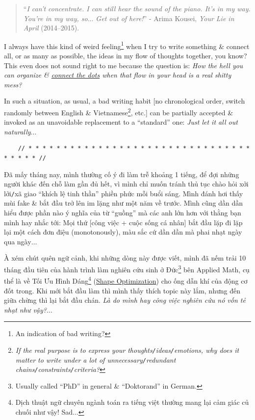 \documentclass[12pt]{article}
\begin{document}
\begin{quotation}
	``{\it I can't concentrate. I can still hear the sound of the piano. It's in my way. You're in my way, so$\ldots$ Get out of here!}'' - Arima Kousei, {\it Your Lie in April} (2014--2015).
\end{quotation}

I always have this kind of weird feeling\footnote{An indication of bad writing?} when I try to write something \& connect all, or as many as possible, the ideas in my flow of thoughts together, you know? This even does not sound right to me because the question is: {\it How the hell you can organize \& \href{https://en.wikipedia.org/wiki/Connect_the_dots}{connect the dots} when that flow in your head is a real shitty mess?}

In such a situation, as usual, a bad writing habit [no chronological order, switch randomly between English \& Vietnamese\footnote{{\it If the real purpose is to express your thoughts{\tt/}ideas{\tt/}emotions, why does it matter to write under a lot of unnecessary{\tt/}redundant chains{\tt/}constraints{\tt/}criteria?}}, etc.] can be partially accepted \& invoked as an unavoidable replacement to a ``standard'' one: {\it Just let it all out naturally$\ldots$}

\begin{verbatim}
	// * * * * * * * * * * * * * * * * * * * * * * * * * * * * * * * * * * * * * //
\end{verbatim}

\noindent
{} Đã mấy tháng nay, mình thường cố ý đi làm trễ khoảng 1 tiếng, để đợi những người khác đến chỗ làm gần đủ hết, vì mình chỉ muốn tránh thủ tục chào hỏi xởi lởi{\tt/}xã giao ``khích lệ tinh thần'' phiền phức mỗi buổi sáng. Mình đánh hơi thấy mùi fake \& bắt đầu trở lên im lặng như một năm về trước. Mình cũng dần dần hiểu được phần nào ý nghĩa của từ ``guồng'' mà các anh lớn hơn với thằng bạn mình hay nhắc tới: Mọi thứ [công việc + cuộc sống cá nhân] bắt đầu lặp đi lặp lại một cách đơn điệu (monotonously), màu sắc cứ dần dần mà phai nhạt ngày qua ngày$\ldots$

À xém chút quên ngữ cảnh, khi những dòng này được viết, mình đã nếm trải 10 tháng đầu tiên của hành trình làm nghiên cứu sinh ở Đức\footnote{Usually called ``PhD'' in general \& ``Doktorand'' in German.} bên Applied Math, cụ thể là về Tối Ưu Hình Dáng\footnote{Dịch thuật ngữ chuyên ngành toán ra tiếng việt thường mang lại cảm giác củ chuối như vậy! Sad$\ldots$} (\href{https://en.wikipedia.org/wiki/Shape_optimization}{Shape Optimization}) cho ống dẫn khí của động cơ đốt trong. Khi mới bắt đầu làm thì mình thấy thích topic này lắm, nhưng đến giữa chừng thì lại bắt đầu chán. {\it Là do mình hay công việc nghiên cứu nó vốn tẻ nhạt như vậy?}$\ldots$
\end{document}
